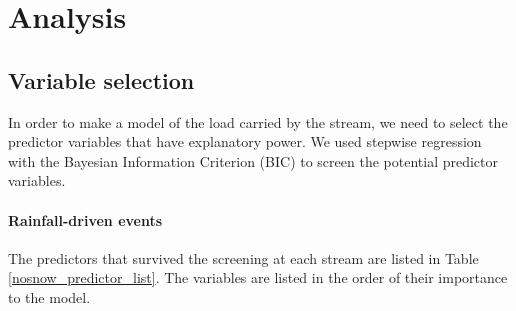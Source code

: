 \documentclass[12pt]{article}
\begin{document}
\section{Analysis}

\subsection{Variable selection}
In order to make a model of the load carried by the stream, we need to select the predictor variables that have explanatory power. We used stepwise regression with the Bayesian Information Criterion (BIC) to screen the potential predictor variables.

\paragraph{Rainfall-driven events} The predictors that survived the screening at each stream are listed in Table \ref{nosnow_predictor_list}. The variables are listed in the order of their importance to the model.\\
\end{document}
